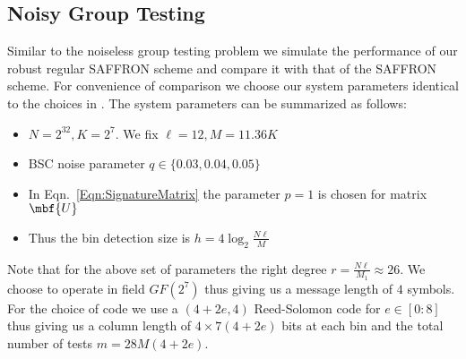 \documentclass[conference,,twocolumn]{IEEEtran}
\newcommand*{\MyPath}{../bib}
\begin{document}
\subsection*{Noisy Group Testing}
Similar to the noiseless group testing problem we simulate the performance of our robust regular SAFFRON scheme and compare it with that of the SAFFRON scheme. For convenience of comparison we choose our system parameters identical to the choices in \cite{lee2015saffron}. The system parameters can be summarized as follows:
\begin{itemize}
\item $N=2^{32}, K=2^7$. We fix $\ell=12, M=11.36K$ 
\item BSC noise parameter $q\in\{0.03,0.04,0.05\}$
\item In Eqn.~\ref{Eqn:SignatureMatrix} the parameter $p=1$ is chosen for matrix $\mbf{U}$
\item Thus the bin detection size is $h=4\log_2 \frac{N\ell}{M}$
\end{itemize}
Note that for the above set of parameters the right degree $r=\frac{N\ell}{M_1}\approx 26$. We choose to operate in field $GF(2^7)$ thus giving us a message length of $4$ symbols. For the choice of code we use a $(4+2e,4)$ Reed-Solomon code for $e\in[0:8]$ thus giving us a column length of $4\times 7(4+2e)$ bits at each bin and the total number of tests $m=28M(4+2e)$.



\end{document}
